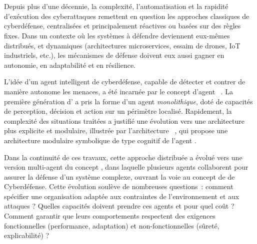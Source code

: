 \clearpage
\thispagestyle{empty}
\null
\newpage

\cleardoublepage
{}
\cleardoublepage
{}

\

\vspace{1em}

\bigskip

\\

\noindent
Depuis plus d'une décennie, la complexité, l'automatisation et la rapidité d'exécution des cyberattaques remettent en question les approches classiques de cyberdéfense, centralisées et principalement réactives ou basées sur des règles fixes. Dans un contexte où les systèmes à défendre deviennent eux-mêmes distribués, et dynamiques (architectures microservices, essaim de drones, IoT industriels, etc.), les mécanismes de défense doivent eux aussi gagner en autonomie, en adaptabilité et en résilience.

L'idée d'un agent intelligent de cyberdéfense, capable de détecter et contrer de manière autonome les menaces, a été incarnée par le concept d'agent ~\cite{Kott2023}. La première génération d' a pris la forme d'un agent \textit{monolithique}, doté de capacités de perception, décision et action sur un périmètre localisé. Rapidement, la complexité des situations traitées a justifié une évolution vers une architecture plus explicite et modulaire, illustrée par l'architecture ~\cite{Kott2023}, qui propose une architecture modulaire symbolique de type cognitif de l'agent .

Dans la continuité de ces travaux, cette approche distribuée a évolué vers une version multi-agent du concept , dans laquelle plusieurs agents collaborent pour assurer la défense d'un système complexe, ouvrant la voie au concept de  de Cyberdéfense. Cette évolution soulève de nombreuses questions~: comment spécifier une organisation adaptée aux contraintes de l'environnement et aux attaques ? Quelles capacités doivent prendre ces agents et pour quel coût ? Comment garantir que leurs comportements respectent des exigences fonctionnelles (performance, adaptation) et non-fonctionnelles (sûreté, explicabilité) ?

